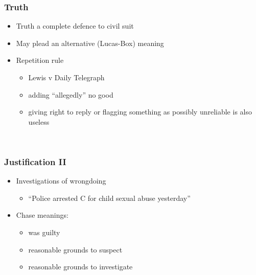 \documentclass[ignorenonframetext,]{beamer}
\begin{document}
\begin{frame}
\frametitle{Truth}

\begin{itemize}
\item  Truth a complete defence to civil suit
\item  May plead an alternative ({Lucas-Box}{) meaning}
\item  Repetition rule

  \begin{itemize}
  \item    Lewis v Daily Telegraph
  \item    adding ``allegedly'' no good
  \item    giving right to reply or flagging something as possibly
    unreliable is also useless
  \end{itemize}
\end{itemize}

~


\end{frame}

\begin{frame}
\frametitle{Justification II}

\begin{itemize}
\item  Investigations of wrongdoing

  \begin{itemize}
  \item    ``Police arrested C for child sexual abuse yesterday''
  \end{itemize}
\item  {Chase} meanings:

  \begin{itemize}
  \item    was guilty
  \item    reasonable grounds to suspect
  \item    reasonable grounds to investigate
  \end{itemize}
\end{itemize}

~


\end{frame}
\end{document}
